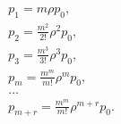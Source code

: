 \begin{equation}
    \begin{aligned}
    & p_1=m \rho p_0, \\
    & p_2=\frac{m^2}{2 !} \rho^2 p_0, \\
    & p_3=\frac{m^3}{3 !} \rho^3 p_0, \\
    & p_m=\frac{m^m}{m !} \rho^m p_0, \\
    & \ldots \\
    & p_{m+r}=\frac{m^m}{m !} \rho^{m+r} p_0 .
    \end{aligned}
\end{equation}